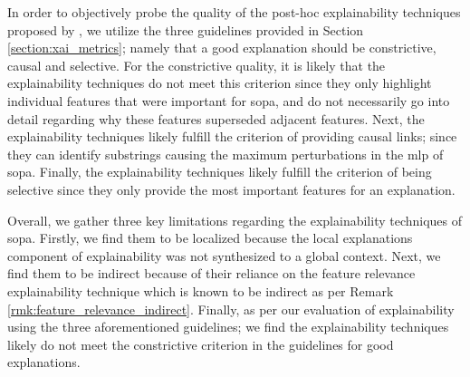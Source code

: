 In order to objectively probe the quality of the post-hoc explainability
techniques proposed by \citet{schwartz2018sopa}, we utilize the three guidelines
provided in Section \ref{section:xai_metrics}; namely that a good explanation
should be constrictive, causal and selective. For the constrictive quality, it
is likely that the explainability techniques do not meet this criterion since
they only highlight individual features that were important for \ac{sopa}, and
do not necessarily go into detail regarding why these features superseded
adjacent features. Next, the explainability techniques likely fulfill the
criterion of providing causal links; since they can identify substrings causing
the maximum perturbations in the \ac{mlp} of \ac{sopa}. Finally, the explainability
techniques likely fulfill the criterion of being selective since they only
provide the most important features for an explanation.

Overall, we gather three key limitations regarding the explainability techniques
of \ac{sopa}. Firstly, we find them to be localized because the local
explanations component of explainability was not synthesized to a global
context. Next, we find them to be indirect because of their reliance on the
feature relevance explainability technique which is known to be indirect as per
Remark \ref{rmk:feature_relevance_indirect}. Finally, as per our evaluation of
explainability using the three aforementioned guidelines; we find the
explainability techniques likely do not meet the constrictive criterion in the
guidelines for good explanations.


